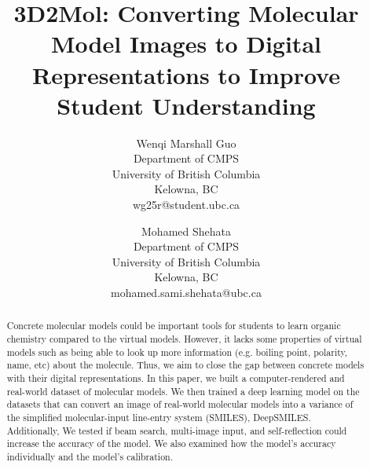 \documentclass[12pt]{article}
\begin{document}
\title{3D2Mol: Converting Molecular Model Images to Digital Representations to Improve Student Understanding}


\author{Wenqi Marshall Guo\\
Department of CMPS\\
University of British Columbia\\
Kelowna, BC\\
wg25r@student.ubc.ca 
\and
Mohamed Shehata\\
Department of CMPS\\
University of British Columbia\\
Kelowna, BC\\
mohamed.sami.shehata@ubc.ca
}

\maketitle


\begin{abstract}
Concrete molecular models could be important tools for students to learn organic chemistry compared to the virtual models. However, it lacks some properties of virtual models such as being able to look up more information (e.g. boiling point, polarity, name, etc) about the molecule. Thus, we aim to close the gap between concrete models with their digital representations. In this paper, we built a computer-rendered and real-world dataset of molecular models. We then trained a deep learning model on the datasets that can convert an image of real-world molecular models into a variance of the simplified molecular-input line-entry system (SMILES), DeepSMILES. Additionally, We tested if beam search, multi-image input, and self-reflection could increase the accuracy of the model. We also examined how the model's accuracy individually and the model's calibration. 

\end{abstract}
\end{document}
